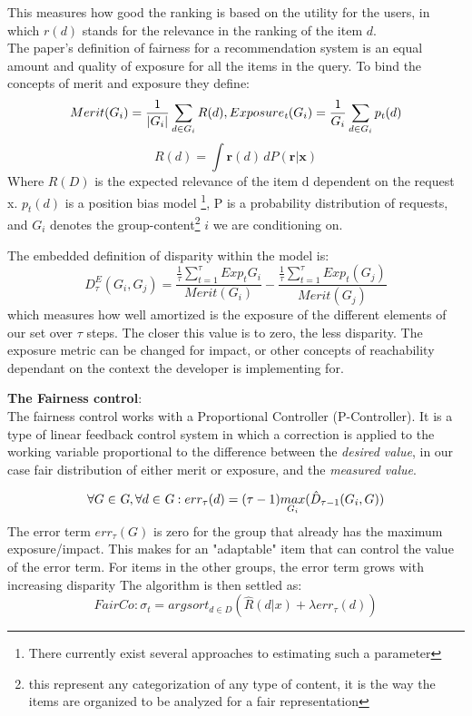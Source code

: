 This measures how good the ranking is based on the utility for the users, in which $r(d)$ stands for the relevance in the ranking of the item $d$.\\
The paper's definition of fairness for a recommendation system is an equal amount and quality of exposure for all the items in the query. To bind the concepts of merit and exposure they define:
\[Merit(G_i) = \frac{1}{|G_i|} \sum_{d \in G_i} R(d),Exposure_\textsl{t} (G_i)  = \frac{1}{G_i}\sum_{d \in G_i} p_\textsl{t}(d) \]
\[ R(d) = \int \textbf{r}(d) \,dP(\textbf{r}|\textbf{x}) \]
Where $R(D)$ is the expected relevance of the item d dependent on the request x. $p_t(d)$ is a position bias model \footnote{There currently exist several approaches to estimating such a parameter },  P is a probability distribution of requests, and $G_i$ denotes the group-content\footnote{this represent any categorization of any type of content, it is the way the items are organized to be analyzed for a fair representation} $i$ we are conditioning on.


The embedded definition of disparity within the model is: \\

\[ D^E_\tau (G_i,G_j) = \frac{\frac{1}{\tau} \sum_{t=1}^{\tau} Exp_t{G_i}  }{Merit(G_i)}  -   \frac{\frac{1}{\tau} \sum_{t=1}^{\tau} Exp_t(G_j)  }{Merit(G_j)}   \] which measures how well amortized is the exposure of the different elements of our set over $\tau$ steps. The closer this value is to zero, the less disparity. The exposure metric can be changed for impact, or other concepts of reachability dependant on the context the developer is implementing for.


\textbf{The Fairness control}:\\
The fairness control works with a Proportional Controller (P-Controller). It is a type of linear feedback control system in which a correction is applied to the working variable proportional to the difference between the \textsl{desired value}, in our case fair distribution of either merit or exposure, and the \textsl{measured value}.

$$\forall G \in \textsl{G}, \forall d \in \textsl{G} : err_\tau(d) = (\tau -1) \underset{G_i}{max}(\hat D_{\tau-1}(G_i,G)) $$
The error term $err_\tau (G)$ is zero for the group that already has the
maximum exposure/impact. This makes for an "adaptable" item that can control the value of the error term. For items in the other
groups, the error term grows with increasing disparity
The algorithm is then settled as:
$$FairCo: \sigma_t = argsort_{d \in D}(\hat R(d|x) + \lambda err_\tau(d))$$

